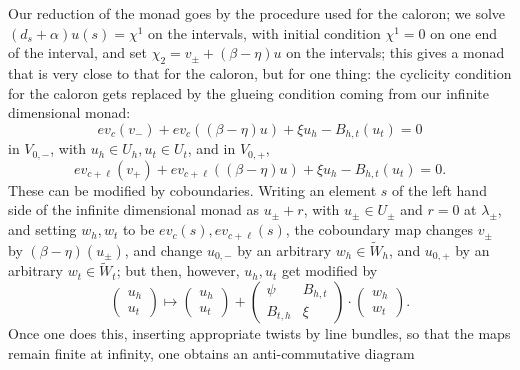 \documentclass[12pt]{article}
\theoremstyle{definition}
\theoremstyle{remark}
\numberwithin{theorem}{section}
\begin{document}
Our reduction of the monad goes by the procedure used for the caloron; we solve $(d_s  +  \alpha)u (s) = \chi^1$ on the intervals, with initial condition $\chi^1 = 0$ on one end of the interval, and set $
\chi_2 =   v_\pm + (\beta-\eta) u$ on the intervals; this gives a monad that is very close to that for the caloron, but for one thing:
  the cyclicity condition for the caloron gets replaced by the glueing condition coming from our infinite dimensional monad:
$$ ev_c(v_-) + ev_c ((\beta-\eta) u) + \xi u_{h} -B_{h,t}( u_{t}) = 0 $$
in $V_{0,-}$, with $u_{h}\in U_{h}, u_{t}\in U_{t}$, and in $V_{0,+}$,
$$ ev_{c+\ell}(v_+) + ev_{c+\ell} ((\beta-\eta) u) + \xi u_{h} -B_{h,t}( u_t) = 0. $$
These can be modified by coboundaries. Writing an element $s$ of the left hand side of the infinite dimensional monad as $u_\pm + r$, with $u_\pm\in U_\pm$ and $r= 0$ at $\lambda_\pm$, and setting $w_h, w_t$ to be $ev_c(s), ev_{c+\ell}(s)$, the coboundary map changes  $v_{\pm}$ by $(\beta-\eta)(u_{\pm})$, and change $u_{0,-}$ by an arbitrary  $w_h \in  \widetilde  W_h $, and $u_{0,+} $ by an arbitrary  $w_t\in  \widetilde  W_t$; but then, however, $u_h, u_t$ get  modified by 
$$ \begin{pmatrix}u_h\\ u_t\end{pmatrix} \mapsto \begin{pmatrix}u_h\\ u_t\end{pmatrix} + \begin{pmatrix}\psi&   B_{h,t}\\ B_{t,h}&\xi \end{pmatrix}\cdot \begin{pmatrix}w_h\\ w_t\end{pmatrix}.$$
Once one does this,  inserting appropriate twists by line bundles, so that the maps remain finite at infinity, one obtains an anti-commutative diagram
\end{document}

